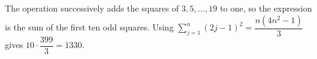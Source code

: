 The operation successively adds the squares of $3,5,\ldots,19$ to one, so the expression is the sum of the first ten odd squares. Using $\sum_{j=1}^n(2j-1)^2=\dfrac{n(4n^2-1)}{3}$ gives $10\cdot\dfrac{399}{3}=\boxed{1330}$.
